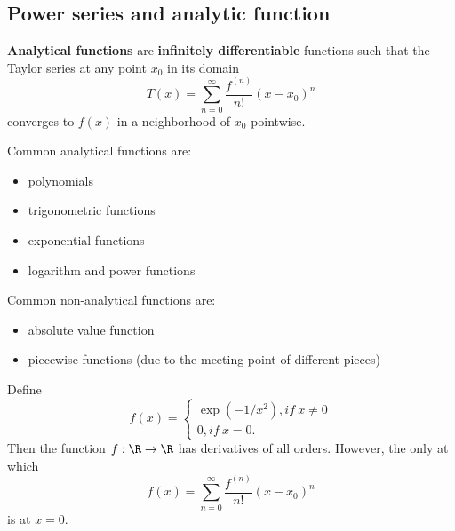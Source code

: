 \begin{refsection}
\subsection{Power series and analytic function}
\begin{definition}\cite[285]{strichartz2000way}
	\textbf{Analytical functions} are \textbf{infinitely differentiable} functions such that the Taylor series at any point $x_0$ in its domain 
	$$T(x) = \sum_{n=0}^\infty \frac{f^{(n)}}{n!}(x-x_0)^n$$
	converges to $f(x)$ in a neighborhood of $x_0$ pointwise.
\end{definition}

\begin{example}
	Common analytical functions are:
	\begin{itemize}
		\item polynomials
		\item trigonometric functions
		\item exponential functions
		\item logarithm and power functions
	\end{itemize}
\end{example}


\begin{example}
	Common non-analytical functions are:
	\begin{itemize}
		\item absolute value function
		\item piecewise functions (due to the meeting point of different pieces)
	\end{itemize}
\end{example}

\begin{example}\cite[221]{fitzpatrick2006advanced} 
	Define 
	$$f(x) = \begin{cases*}
	\exp(-1/x^2), if~ x\neq 0\\
	0, if~ x = 0.
	\end{cases*}$$	
	Then the function $f:\R\to \R$ has derivatives of all orders. However, the only at which 
	$$f(x) = \sum_{n=0}^\infty \frac{f^{(n)}}{n!}(x-x_0)^n$$
	is at $x = 0.$
\end{example}



\end{refsection}
